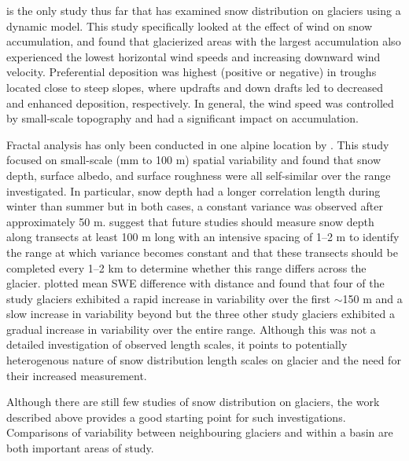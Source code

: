 \documentclass[12pt]{article}
\begin{document}
\cite{Dadic2010} is the only study thus far that has examined snow distribution on glaciers using a dynamic model. This study specifically looked at the effect of wind on snow accumulation, and found that glacierized areas with the largest accumulation also experienced the lowest horizontal wind speeds and increasing downward wind velocity. Preferential deposition was highest (positive or negative) in troughs located close to steep slopes, where updrafts and down drafts led to decreased and enhanced deposition, respectively. In general, the wind speed was controlled by small-scale topography and had a significant impact on accumulation. 

Fractal analysis has only been conducted in one alpine location by \cite{Arnold2003}. This study focused on small-scale (mm to 100 m) spatial variability and found that snow depth, surface albedo, and surface roughness were all self-similar over the range investigated. In particular, snow depth had a longer correlation length during winter than summer but in both cases, a constant variance was observed after approximately 50 m.  \cite{Arnold2003} suggest that future studies should measure snow depth along transects at least 100 m long with an intensive spacing of 1--2 m to identify the range at which variance becomes constant and that these transects should be completed every 1--2 km to determine whether this range differs across the glacier. \cite{McGrath2015} plotted mean SWE difference with distance and found that four of the study glaciers exhibited a rapid increase in variability over the first $\sim$150 m and a slow increase in variability beyond but the three other study glaciers exhibited a gradual increase in variability over the entire range. Although this was not a detailed investigation of observed length scales, it points to potentially heterogenous nature of snow distribution length scales on glacier and the need for their increased measurement.

Although there are still few studies of snow distribution on glaciers, the work described above provides a good starting point for such investigations. Comparisons of variability between neighbouring glaciers and within a basin are both important areas of study.
\end{document}
